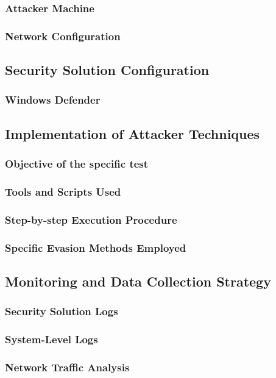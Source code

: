 \documentclass[11pt]{article}
\begin{document}
				\subsubsection{Attacker Machine}
				\subsubsection{Network Configuration}
			\subsection{Security Solution Configuration}
				\subsubsection{Windows Defender}
			\subsection{Implementation of Attacker Techniques}
				\subsubsection{Objective of the specific test}
				\subsubsection{Tools and Scripts Used}
				\subsubsection{Step-by-step Execution Procedure}
				\subsubsection{Specific Evasion Methods Employed}
			\subsection{Monitoring and Data Collection Strategy}
				\subsubsection{Security Solution Logs}
				\subsubsection{System-Level Logs}
				\subsubsection{Network Traffic Analysis}
\end{document}
